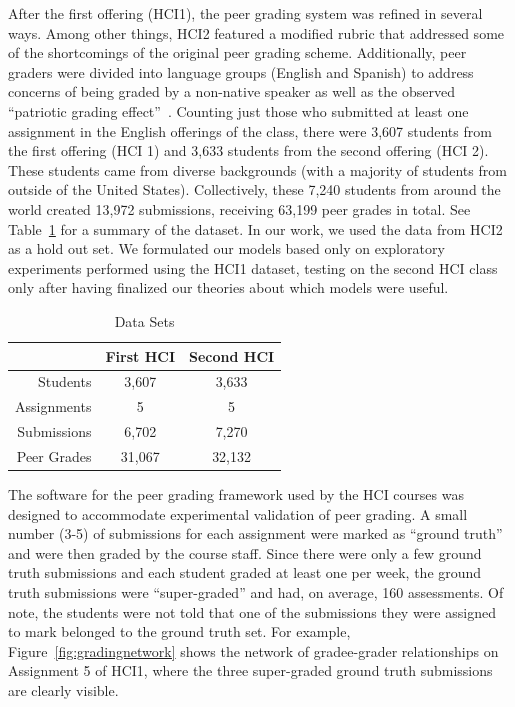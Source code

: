 After the first offering (HCI1), the peer grading system was refined in several ways. Among other things, HCI2 featured a modified rubric that
addressed some of the shortcomings of the original peer grading scheme. Additionally, peer graders were divided into language groups
(English and Spanish) to address concerns of being graded
by a non-native speaker as well as the observed ``patriotic
grading effect''~\cite{kulkarni13}.  
Counting just those who submitted at least one assignment 
in the English offerings of the class, there were 3,607 students 
from the first offering (HCI 1) and 3,633 students
from the second offering (HCI 2).  These students came from diverse backgrounds
 (with a majority of students from outside of the United States). 
 Collectively, these 7,240 students from around the world 
created 13,972 submissions, receiving 63,199 peer grades in total. See Table~\ref{tab:datasets} for a summary of the dataset.
In our work, we used the data
from HCI2 as a hold out set. We formulated our models based only on exploratory experiments performed using the HCI1 dataset, testing on the second HCI
class only after having finalized our theories about which
models were useful.

\begin{table}[t!]
\caption{Data Sets}
\begin{center}
\begin{tabular}{rcc}
\hline
 &  First HCI & Second HCI \\
\hline
Students  & 3,607  &  3,633\\
Assignments & 5  &  5\\
Submissions & 6,702 & 7,270\\
Peer Grades & 31,067  &  32,132\\
\hline
\end{tabular}
\end{center}
\label{tab:datasets}

\end{table}


The software for the peer grading framework
used by the HCI courses was designed to accommodate experimental validation of peer grading. A small number (3-5)
of submissions for each assignment were marked as ``ground
truth'' and were then graded by the course staff. Since there
were only a few ground truth submissions and each student
graded at least one per week, the ground truth submissions
were ``super-graded'' and had, on average, 160 assessments.
Of note, the students were not told that one of the submissions they were assigned to mark belonged to the ground truth set. For
example, Figure~\ref{fig:gradingnetwork} shows the network of gradee-grader relationships on Assignment 5 of HCI1, where the three super-graded ground truth submissions are clearly visible. %
